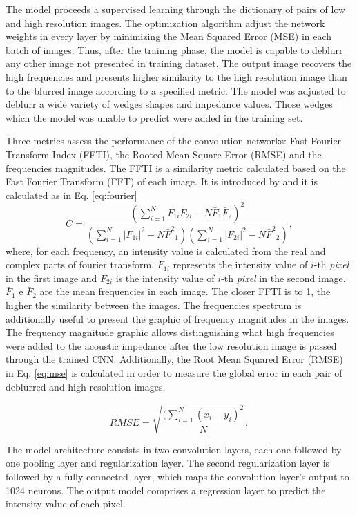 \documentclass[conference,compsoc]{IEEEtran}
\begin{document}
The model proceeds a supervised learning through the dictionary of pairs of low
and high resolution images. The optimization algorithm adjust the 
network weights in every layer by minimizing the Mean Squared Error (MSE)
in each batch of images. Thus, after the training phase, the model is capable
to deblurr any other image not presented in training dataset. The output
image recovers the high frequencies and presents higher similarity
to the high resolution image than to the blurred image according to a
specified metric. The model was adjusted to deblurr a wide variety
of wedges shapes and impedance values. Those wedges which the model was unable
to predict were added in the training set.

Three metrics assess the performance of the convolution networks: Fast Fourier Transform Index (FFTI),
the Rooted Mean Square Error (RMSE) and the frequencies magnitudes.
The FFTI is a similarity metric calculated based on the Fast Fourier Transform (FFT) of each image.
It is introduced by \cite{naranyana} and it is calculated as in Eq. \ref{eq:fourier}
\begin{equation}
 C = \frac{ (\sum_{i=1}^{N}{F_{1i}F_{2i}} - N \bar{F}_1\bar{F}_2 )^2 }{ (\sum_{i=1}^{N}{|F_{1i}|^2} - N{\bar{F}^2}_1)( \sum_{i=1}^{N}{|F_{2i}|^2} - N{\bar{F}^2}_2 )},
 \label{eq:fourier}
\end{equation}
where, for each frequency, an intensity value is calculated from the real and complex parts of fourier
transform. $F_{1i}$ represents the intensity value of $i$-th \textit{pixel} in the first image and $F_{2i}$
is the intensity value of $i$-th \textit{pixel} in the second image. $\bar{F}_1$ e $\bar{F}_2$ are the mean
frequencies in each image. The closer FFTI is to 1, the higher the similarity between the images.
The frequencies spectrum is additionally useful to present the graphic of frequency magnitudes in the images.
The frequency magnitude graphic allows distinguishing what high frequencies were added to the acoustic impedance
after the low resolution image is passed through the trained CNN. 
Additionally, the Root Mean Squared Error (RMSE) in Eq. \ref{eq:mse} is calculated in order to measure
the global error in each pair of deblurred and high resolution images.

\begin{equation}
 RMSE = \sqrt{\frac{ (\sum_{i=1}^{N}{(x_i -y_i)^2 } }{N}},
 \label{eq:mse}
\end{equation}

The model architecture consists in two convolution layers, each one followed by one
pooling layer and regularization layer. The second regularization layer is followed
by a fully connected layer, which maps the convolution layer's output to 1024 neurons.
The output model comprises a regression layer to predict the intensity value of each pixel.
\end{document}
